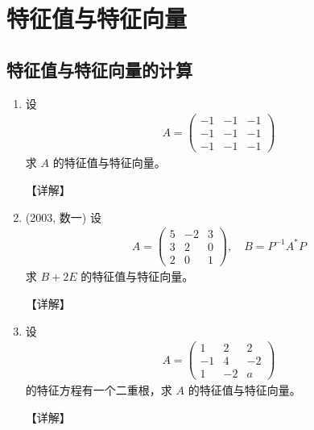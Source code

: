 \documentclass[12pt, a4paper, oneside, UTF8]{ctexbook}
\begin{document}
% 
\else
\fi

\chapter{特征值与特征向量}

\section{特征值与特征向量的计算}

\begin{enumerate}[label=\arabic*.]
    \item 设
    \begin{align*}
    A = \begin{pmatrix}
    -1 & -1 & -1 \\
    -1 & -1 & -1 \\
    -1 & -1 & -1
    \end{pmatrix}
    \end{align*}
    求 $A$ 的特征值与特征向量。
    
    \begin{solution}
    【详解】
    \end{solution}
    
    \item (2003, 数一) 设
    \begin{align*}
    A = \begin{pmatrix}
    5 & -2 & 3 \\
    3 & 2 & 0 \\
    2 & 0 & 1
    \end{pmatrix}, \quad
    B = P^{-1} A^* P
    \end{align*}
    求 $B + 2E$ 的特征值与特征向量。
    
    \begin{solution}
    【详解】
    \end{solution}
    
    \item 设
    \begin{align*}
    A = \begin{pmatrix}
    1 & 2 & 2 \\
    -1 & 4 & -2 \\
    1 & -2 & a
    \end{pmatrix}
    \end{align*}
    的特征方程有一个二重根，求 $A$ 的特征值与特征向量。
    
    \begin{solution}
    【详解】
    \end{solution}
    

\end{enumerate}
\end{document}

